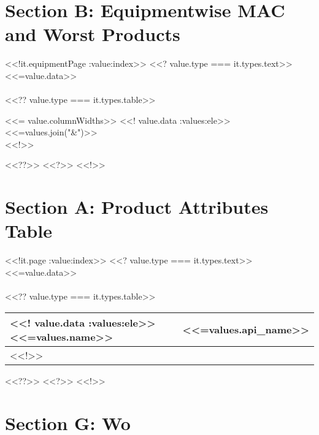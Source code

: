 \documentclass{article}
\begin{document}
        \newpage
        \section{Section B: Equipmentwise MAC and Worst Products}
         <<!it.equipmentPage :value:index>>
            <<? value.type === it.types.text>>
                <<=value.data>>\\\\
                <<?? value.type === it.types.table>>
                    \begin{longtable}[l]{<<= value.columnWidths>>}\hline
                    <<! value.data :values:ele>>
                        <<=values.join("&")>>\\\hline
                    <<!>>
                    \end{longtable}
                <<??>>
            <<?>>
        <<!>>
        \newpage
        \section{Section A: Product Attributes Table}
        <<!it.page :value:index>>
            <<? value.type === it.types.text>>
                <<=value.data>>\\\\
                <<?? value.type === it.types.table>>
                    \begin{longtable}[l]{|p{2.5cm}| p{2.5cm}|}\hline
                    <<! value.data :values:ele>>
                        <<=values.name>> & <<=values.api_name>>\\\hline
                    <<!>>
                    \end{longtable}
                <<??>>
            <<?>>
        <<!>>
        \newpage
        \section{Section G: Wo}
        
\end{document}
